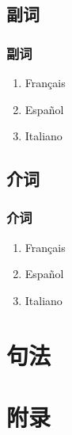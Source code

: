 \documentclass[UTF8,a4paper,titlepage,10pt]{report}
\begin{document}
\chapter{副词}
\label{sec:orga60f44d}

\section{副词}
\label{sec:orgac8dbaf}

\begin{enumerate}
\item Français
\label{sec:org926ec8a}

\item Español
\label{sec:org4212ee9}

\item Italiano
\label{sec:orgc3d2fb3}
\end{enumerate}

\chapter{介词}
\label{sec:org8b47af9}

\section{介词}
\label{sec:org9975718}

\begin{enumerate}
\item Français
\label{sec:org147221a}

\item Español
\label{sec:org3e160f0}

\item Italiano
\label{sec:org0952d7e}
\end{enumerate}

\part{句法}
\label{sec:org671c781}

\newpage
\part{附录}
\label{sec:orgb0ae575}

\listoftables

\listoffigures

\printindex
\end{document}
